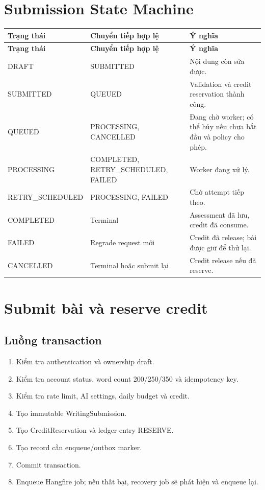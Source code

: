\documentclass[11pt,a4paper]{article}
\begin{document}
\section{Submission State Machine}

\begin{longtable}{|P{0.23\textwidth}|P{0.25\textwidth}|P{0.41\textwidth}|}
\hline
\textbf{Trạng thái} & \textbf{Chuyển tiếp hợp lệ} & \textbf{Ý nghĩa} \\ \hline
\endfirsthead
\hline
\textbf{Trạng thái} & \textbf{Chuyển tiếp hợp lệ} & \textbf{Ý nghĩa} \\ \hline
\endhead
DRAFT & SUBMITTED & Nội dung còn sửa được. \\ \hline
SUBMITTED & QUEUED & Validation và credit reservation thành công. \\ \hline
QUEUED & PROCESSING, CANCELLED & Đang chờ worker; có thể hủy nếu chưa bắt đầu và policy cho phép. \\ \hline
PROCESSING & COMPLETED, RETRY\_SCHEDULED, FAILED & Worker đang xử lý. \\ \hline
RETRY\_SCHEDULED & PROCESSING, FAILED & Chờ attempt tiếp theo. \\ \hline
COMPLETED & Terminal & Assessment đã lưu, credit đã consume. \\ \hline
FAILED & Regrade request mới & Credit đã release; bài được giữ để thử lại. \\ \hline
CANCELLED & Terminal hoặc submit lại & Credit release nếu đã reserve. \\ \hline
\end{longtable}

\section{Submit bài và reserve credit}

\subsection{Luồng transaction}
\begin{enumerate}
  \item Kiểm tra authentication và ownership draft.
  \item Kiểm tra account status, word count 200/250/350 và idempotency key.
  \item Kiểm tra rate limit, AI settings, daily budget và credit.
  \item Tạo immutable WritingSubmission.
  \item Tạo CreditReservation và ledger entry RESERVE.
  \item Tạo record cần enqueue/outbox marker.
  \item Commit transaction.
  \item Enqueue Hangfire job; nếu thất bại, recovery job sẽ phát hiện và enqueue lại.
\end{enumerate}
\end{document}
